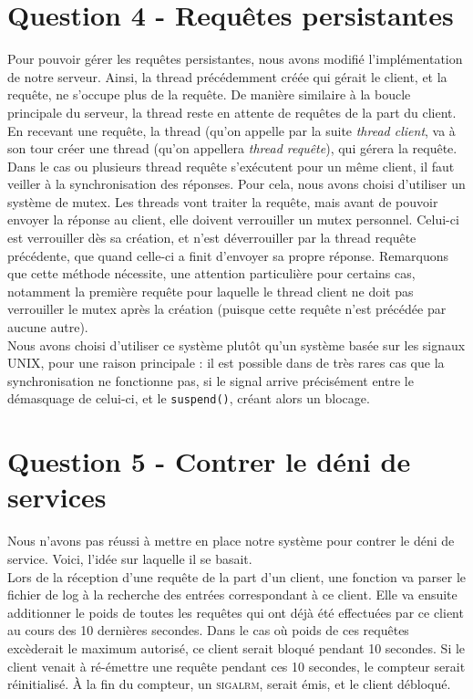 \documentclass[final,12pt]{article}
\begin{document}
\section*{\textbf{Question 4} - Requêtes persistantes {\color{green}\checkmark}}
	Pour pouvoir gérer les requêtes persistantes, nous avons modifié l'implémentation de notre serveur.
	Ainsi, la thread précédemment créée qui gérait le client, et la requête, ne s'occupe plus de la requête. De manière similaire à la boucle principale du serveur, la thread reste en attente de requêtes de la part du client. En recevant une requête, la thread (qu'on appelle par la suite \textit{thread client}, va à son tour créer une thread (qu'on appellera \textit{thread requête}), qui gérera la requête.
	Dans le cas ou plusieurs thread requête s'exécutent pour un même client, il faut veiller à la synchronisation des réponses. Pour cela, nous avons choisi d'utiliser un système de mutex.
	Les threads vont traiter la requête, mais avant de pouvoir envoyer la réponse au client, elle doivent verrouiller un mutex personnel. Celui-ci est verrouiller dès sa création, et n'est déverrouiller par la thread requête précédente, que quand celle-ci a finit d'envoyer sa propre réponse. Remarquons que cette méthode nécessite, une attention particulière pour certains cas, notamment la première requête pour laquelle le thread client ne doit pas verrouiller le mutex après la création (puisque cette requête n'est précédée par aucune autre).\\
	Nous avons choisi d'utiliser ce système plutôt qu'un système basée sur les signaux UNIX, pour une raison principale : il est possible dans de très rares cas que la synchronisation ne fonctionne pas, si le signal arrive précisément entre le démasquage de celui-ci, et le \texttt{suspend()}, créant alors un blocage.

\section*{\textbf{Question 5} - Contrer le déni de services {\color{red}}}
	Nous n'avons pas réussi à mettre en place notre système pour contrer le déni de service.
	Voici, l'idée sur laquelle il se basait.\\
	Lors de la réception d'une requête de la part d'un client, une fonction va parser le fichier de log à la recherche des entrées correspondant à ce client. Elle va ensuite additionner le poids de toutes les requêtes qui ont déjà été effectuées par ce client au cours des 10 dernières secondes. Dans le cas où poids de ces requêtes excèderait le maximum autorisé, ce client serait bloqué pendant 10 secondes. Si le client venait à ré-émettre une requête pendant ces 10 secondes, le compteur serait réinitialisé. \`A la fin du compteur, un \textsc{sigalrm}, serait émis, et le client débloqué.
\end{document}

